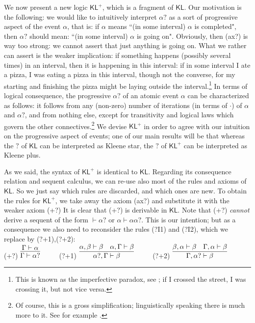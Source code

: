 \documentclass{eptcs}
\newcommand{\KL}{\mathsf{KL}}
\begin{document}
We now present a new logic $\KL^+$, which is a fragment of $\KL$.
Our motivation is the following: we would like to intuitively interpret 
$\alpha?$ as a sort of progressive aspect of the event
$\alpha$, that is: if $\alpha$ means ``(in some interval) $\alpha$ is completed",
then $\alpha?$ should mean: ``(in some interval) $\alpha$ 
is going on". Obviously, then (ax?) is way too strong: we
cannot assert that just anything is going on. What we rather can assert
is the weaker implication: if something happens (possibly several times)
in an interval, then it is happening in this interval:
if in some interval I ate a pizza, I was eating a pizza in this interval,
though not the converse, for my starting and finishing
the pizza might be laying outside the interval.\footnote{This is known as 
the imperfective paradox, 
see \cite{moenssteedman:ontology}; if I crossed the street, I was
crossing it, but not vice versa.} In terms of logical consequence, 
the progressive $\alpha?$ of an atomic
event $\alpha$ can be characterized as follows: it follows from any
(non-zero) number of iterations (in terms of $\cdot$) 
of $\alpha$ and $\alpha?$, 
and from nothing else, except for transitivity and logical laws which govern the
other connectives.\footnote{Of course, this is a gross
simplification; linguistically speaking there is much more to it.
See for example \cite{galton:aspect}.}
We devise $\KL^+$ in order
to agree with our intuition on the progressive aspect of events;
one of our main results will be that whereas the $?$ of $\KL$ can be
interpreted as Kleene star, the $?$ of $\KL^+$ can be interpreted
as Kleene plus.

As we said, the syntax of $\KL^+$ is identical to $\KL$. 
Regarding its consequence relation and sequent calculus, we
can re-use also most of the rules and axioms of $\KL$. So we just
say which rules are discarded, and which ones are new.
To obtain the rules for $\KL^+$, we take away 
the axiom (ax?)
and substitute it with the weaker axiom  (+?)
It is clear that (+?) is derivable in $\KL$.
Note that (+?) \textit{cannot} derive a sequent of the form
$\vdash\alpha?$ or
$\alpha\vdash\alpha\alpha?$. This is our intention; but as a consequence
we also need to reconsider the rules (?I1) and (?I2), which we 
replace by (?+1),(?+2): 
\\

(+?) $\infer{\Gamma\vdash\alpha?}{\Gamma\vdash \alpha}$
$\qquad$ (?+1) $\infer{\alpha?,\Gamma\vdash\beta}
{\alpha,\beta\vdash\beta & \alpha,\Gamma\vdash\beta}$
$\qquad$ (?+2) $\infer{\Gamma,\alpha?\vdash\beta}
{\beta,\alpha\vdash\beta & \Gamma,\alpha\vdash\beta}$
\\
\end{document}
